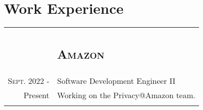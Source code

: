 \documentclass[letterpaper,10pt]{article}
\begin{document}
\section{Work Experience}
\begin{tabular}{R|B}

	                                & \subsection{\textsc{Amazon}}                                                                   \\

	\textsc{Sept.} 2022 -           & Software Development Engineer II                                                               \\
	Present\phantom{ -}             & \footnotesize Working on the Privacy@Amazon team.                                              \\
	                                                                                                             \\


\end{tabular}
\end{document}
